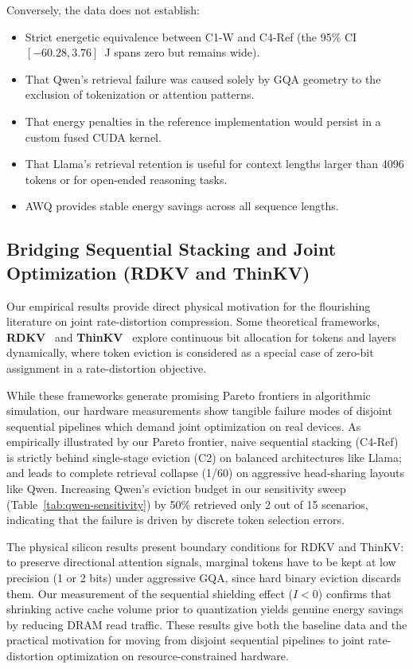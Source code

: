 \documentclass[sigconf,nonacm]{acmart}
\begin{document}
Conversely, the data does not establish:
\begin{itemize}
  \item Strict energetic equivalence between C1-W and C4-Ref (the 95\% CI $[-60.28, 3.76]$~J spans zero but remains wide).
  \item That Qwen's retrieval failure was caused solely by GQA geometry to the exclusion of tokenization or attention patterns.
  \item That energy penalties in the reference implementation would persist in a custom fused CUDA kernel.
  \item That Llama's retrieval retention is useful for context lengths larger than 4096 tokens or for open-ended reasoning tasks.
  \item AWQ provides stable energy savings across all sequence lengths.
\end{itemize}

\subsection{Bridging Sequential Stacking and Joint Optimization (RDKV and ThinKV)}
\label{sec:joint-opt}

Our empirical results provide direct physical motivation for the flourishing literature on joint rate-distortion compression. Some theoretical frameworks, \textbf{RDKV}~\cite{zhang_rdkv_2026} and \textbf{ThinKV}~\cite{ramachandran_thinkv_2026} explore continuous bit allocation for tokens and layers dynamically, where token eviction is considered as a special case of zero-bit assignment in a rate-distortion objective.

While these frameworks generate promising Pareto frontiers in algorithmic simulation, our hardware measurements show tangible failure modes of disjoint sequential pipelines which demand joint optimization on real devices. As empirically illustrated by our Pareto frontier, naive sequential stacking (C4-Ref) is strictly behind single-stage eviction (C2) on balanced architectures like Llama; and leads to complete retrieval collapse (1/60) on aggressive head-sharing layouts like Qwen. Increasing Qwen's eviction budget in our sensitivity sweep (Table~\ref{tab:qwen-sensitivity}) by 50\% retrieved only 2 out of 15 scenarios, indicating that the failure is driven by discrete token selection errors.

The physical silicon results present boundary conditions for RDKV and ThinKV: to preserve directional attention signals, marginal tokens have to be kept at low precision (1 or 2 bits) under aggressive GQA, since hard binary eviction discards them. Our measurement of the sequential shielding effect ($I < 0$) confirms that shrinking active cache volume prior to quantization yields genuine energy savings by reducing DRAM read traffic. These results give both the baseline data and the practical motivation for moving from disjoint sequential pipelines to joint rate-distortion optimization on resource-constrained hardware.
\end{document}
